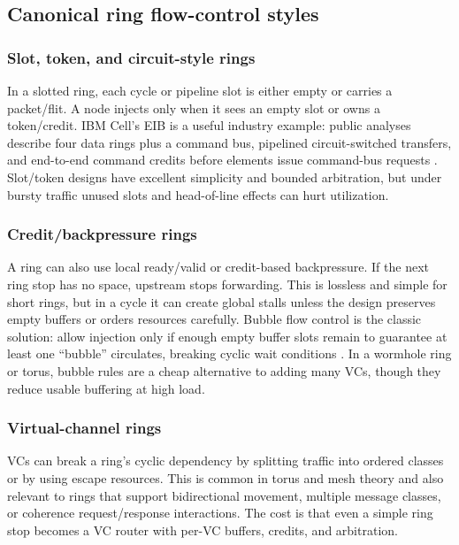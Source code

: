 \documentclass[11pt]{article}
\begin{document}
\subsection{Canonical ring flow-control styles}

\subsubsection{Slot, token, and circuit-style rings}

In a slotted ring, each cycle or pipeline slot is either empty or carries a packet/flit. A node injects only when it sees an empty slot or owns a token/credit. IBM Cell's EIB is a useful industry example: public analyses describe four data rings plus a command bus, pipelined circuit-switched transfers, and end-to-end command credits before elements issue command-bus requests \cite{Ainsworth2006Cell}. Slot/token designs have excellent simplicity and bounded arbitration, but under bursty traffic unused slots and head-of-line effects can hurt utilization.

\subsubsection{Credit/backpressure rings}

A ring can also use local ready/valid or credit-based backpressure. If the next ring stop has no space, upstream stops forwarding. This is lossless and simple for short rings, but in a cycle it can create global stalls unless the design preserves empty buffers or orders resources carefully. Bubble flow control is the classic solution: allow injection only if enough empty buffer slots remain to guarantee at least one ``bubble'' circulates, breaking cyclic wait conditions \cite{Carrion1997Bubble}. In a wormhole ring or torus, bubble rules are a cheap alternative to adding many VCs, though they reduce usable buffering at high load.

\subsubsection{Virtual-channel rings}

VCs can break a ring's cyclic dependency by splitting traffic into ordered classes or by using escape resources. This is common in torus and mesh theory and also relevant to rings that support bidirectional movement, multiple message classes, or coherence request/response interactions. The cost is that even a simple ring stop becomes a VC router with per-VC buffers, credits, and arbitration.
\end{document}
